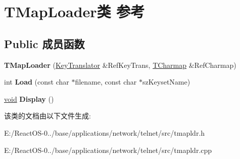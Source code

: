 \hypertarget{class_t_map_loader}{}\section{T\+Map\+Loader类 参考}
\label{class_t_map_loader}
\subsection*{Public 成员函数}
\begin{DoxyCompactItemize}
\item 
\mbox{\label{class_t_map_loader_a5dcad5b99eb09311b1a0dc00a5444bde}} 
{\bfseries T\+Map\+Loader} (\hyperlink{class_key_translator}{Key\+Translator} \&Ref\+Key\+Trans, \hyperlink{class_t_charmap}{T\+Charmap} \&Ref\+Charmap)
\item 
\mbox{\label{class_t_map_loader_a7c04567891876d1a3d43318dbd1683d7}} 
int {\bfseries Load} (const char $\ast$filename, const char $\ast$sz\+Keyset\+Name)
\item 
\mbox{\label{class_t_map_loader_a9e5ebc4b55c558713c6904077bd6a8b9}} 
\hyperlink{interfacevoid}{void} {\bfseries Display} ()
\end{DoxyCompactItemize}


该类的文档由以下文件生成\+:\begin{DoxyCompactItemize}
\item 
E\+:/\+React\+O\+S-\/0../base/applications/network/telnet/src/tmapldr.\+h\item 
E\+:/\+React\+O\+S-\/0../base/applications/network/telnet/src/tmapldr.\+cpp\end{DoxyCompactItemize}
